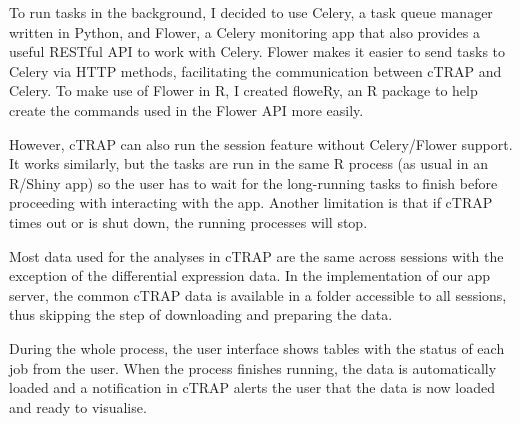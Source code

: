 To run tasks in the background, I decided to use Celery, a task queue manager written in Python, and Flower, a Celery monitoring app that also provides a useful RESTful API to work with Celery. Flower makes it easier to send tasks to Celery via HTTP methods, facilitating the communication between cTRAP and Celery. To make use of Flower in R, I created floweRy, an R package to help create the commands used in the Flower API more easily.

However, cTRAP can also run the session feature without Celery/Flower support. It works similarly, but the tasks are run in the same R process (as usual in an R/Shiny app) so the user has to wait for the long-running tasks to finish before proceeding with interacting with the app. Another limitation is that if cTRAP times out or is shut down, the running processes will stop.

Most data used for the analyses in cTRAP are the same across sessions with the exception of the differential expression data. In the implementation of our app server, the common cTRAP data is available in a folder accessible to all sessions, thus skipping the step of downloading and preparing the data.

During the whole process, the user interface shows tables with the status of each job from the user. When the process finishes running, the data is automatically loaded and a notification in cTRAP alerts the user that the data is now loaded and ready to visualise.
